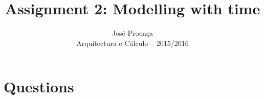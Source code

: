 \documentclass[11pt]{article}
\theoremstyle{myplain}
\theoremstyle{definition} %
\begin{document}
 
 
\title{Assignment 2: Modelling with time}
\author{Jos\'{e} Proen\c{c}a\\
Arquitectura e C\'alculo -- 2015/2016} 
 
\maketitle
 
\section*{Questions}

%
%
%
%
%
\end{document}
